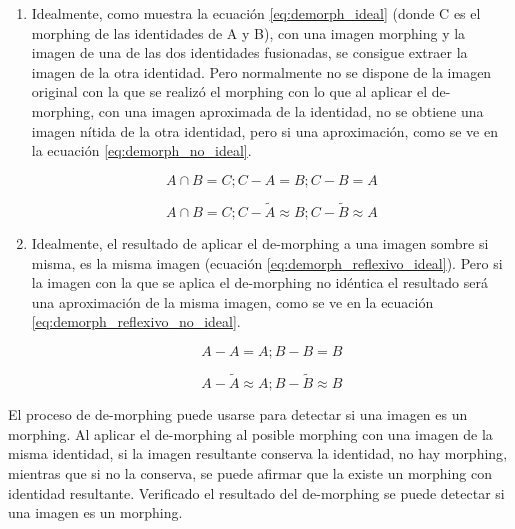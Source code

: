  \renewcommand{\labelenumi}{\alph{enumi}}
 \renewcommand{\labelenumi}{\theenumi)}
\begin{enumerate}
\item 
Idealmente, como muestra la ecuación \ref{eq:demorph_ideal} (donde C es el morphing de las identidades de A y B), con una imagen \gls{morphing} y la imagen de una de las dos identidades fusionadas, se consigue extraer la imagen de la otra identidad. Pero normalmente no se dispone de la imagen original con la que se realizó el \gls{morphing} con lo que al aplicar el \gls{de-morphing}, con una imagen aproximada de la identidad, no se obtiene una imagen nítida de la otra identidad, pero si una aproximación, como se ve en la ecuación \ref{eq:demorph_no_ideal}.

\begin{equation}\label{eq:demorph_ideal}
  A \cap B = C; C - A = B;C - B = A
\end{equation}

\begin{equation}\label{eq:demorph_no_ideal}
  A \cap B = C; C - \tilde{A} \approx B;C - \tilde{B} \approx A
\end{equation}

\item
Idealmente, el resultado de aplicar el \gls{de-morphing} a una imagen sombre si misma,  es la misma imagen (ecuación \ref{eq:demorph_reflexivo_ideal}). Pero si la imagen con la que se aplica el \gls{de-morphing} no idéntica el resultado será una aproximación de la misma imagen, como se ve en la ecuación \ref{eq:demorph_reflexivo_no_ideal}. 

\begin{equation}\label{eq:demorph_reflexivo_ideal}
  A - A = A;B - B = B
\end{equation}

\begin{equation}\label{eq:demorph_reflexivo_no_ideal}
  A - \tilde{A} \approx A;B - \tilde{B} \approx B
\end{equation}

\end{enumerate}

El proceso de \gls{de-morphing} puede usarse para detectar si una imagen es un \gls{morphing}. Al aplicar el \gls{de-morphing} al posible \gls{morphing} con una imagen de la misma identidad, si la imagen resultante conserva la identidad, no hay \gls{morphing}, mientras que si no la conserva, se puede afirmar que la existe un \gls{morphing} con identidad resultante. Verificado el resultado del \gls{de-morphing} se puede detectar si una imagen es un \gls{morphing}. 

